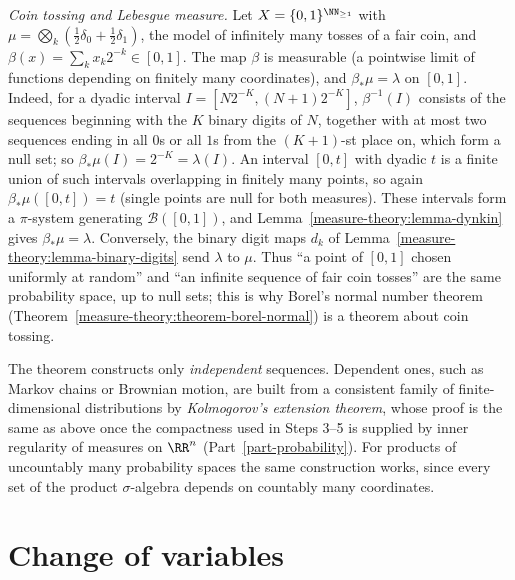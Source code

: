 \begin{example}\label{measure-theory:example-coin-tossing}
\emph{Coin tossing and Lebesgue measure.} Let $X = \{0, 1\}^{\NN_{\geq 1}}$ with $\mu = \bigotimes_k(\frac12\delta_0 + \frac12\delta_1)$, the model of infinitely many tosses of a fair coin, and
$\beta(x) = \sum_kx_k2^{-k} \in [0, 1]$. The map $\beta$ is measurable (a pointwise limit of functions depending on finitely many coordinates), and $\beta_*\mu = \lambda$ on $[0, 1]$. Indeed, for a dyadic
interval $I = [N2^{-K}, (N + 1)2^{-K}]$, $\beta^{-1}(I)$ consists of the sequences beginning with the $K$ binary digits of $N$, together with at most two sequences ending in all $0$s or all $1$s from
the $(K+1)$-st place on, which form a null set; so $\beta_*\mu(I) = 2^{-K} = \lambda(I)$. An interval $[0, t]$ with dyadic $t$ is a finite union of such intervals overlapping in finitely many points, so
again $\beta_*\mu([0, t]) = t$ (single points are null for both measures). These intervals form a $\pi$-system generating $\mathcal{B}([0, 1])$, and
Lemma~\ref{measure-theory:lemma-dynkin} gives $\beta_*\mu = \lambda$. Conversely, the binary digit maps $d_k$ of Lemma~\ref{measure-theory:lemma-binary-digits} send $\lambda$ to $\mu$. Thus ``a point of
$[0, 1]$ chosen uniformly at random'' and ``an infinite sequence of fair coin tosses'' are the same probability space, up to null sets; this is why Borel's normal number theorem
(Theorem~\ref{measure-theory:theorem-borel-normal}) is a theorem about coin tossing.
\end{example}

\begin{remark}\label{measure-theory:remark-kolmogorov-extension}
The theorem constructs only \emph{independent} sequences. Dependent ones, such as Markov chains or Brownian motion, are built from a consistent family of finite-dimensional distributions by
\emph{Kolmogorov's extension theorem}, whose proof is the same as above once the compactness used in Steps 3--5 is supplied by inner regularity of measures on $\RR^n$ (Part~\ref{part-probability}). For
products of uncountably many probability spaces the same construction works, since every set of the product $\sigma$-algebra depends on countably many coordinates.
\end{remark}

\section{Change of variables}\label{measure-theory:section-change-of-variables}

